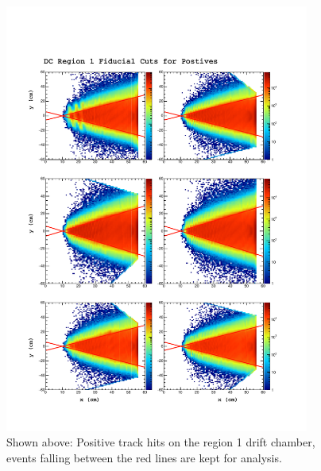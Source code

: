 \begin{figure}
  \begin{center}
    \includegraphics[width=10cm]{image/fid.pdf}
    \caption{Shown above: Positive track hits on the region 1 drift chamber, events falling between the red lines are kept for analysis.}
  \end{center}
\end{figure}



